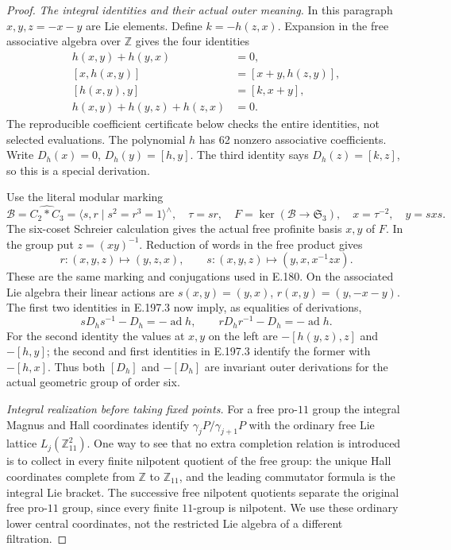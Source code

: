 \begin{proof}
\emph{The integral identities and their actual outer meaning.}
In this paragraph \(x,y,z=-x-y\) are Lie elements.  Define
\(k=-h(z,x)\).  Expansion in the free associative algebra over
\(\mathbb Z\) gives the four identities
\[
\begin{aligned}
h(x,y)+h(y,x)&=0,\\
[x,h(x,y)]&=[x+y,h(z,y)],\\
[h(x,y),y]&=[k,x+y],\\
h(x,y)+h(y,z)+h(z,x)&=0.
\end{aligned}
\tag{E.197.3}
\]
The reproducible coefficient certificate below checks the entire
identities, not selected evaluations.  The polynomial \(h\) has
62 nonzero associative coefficients.  Write
\(D_h(x)=0\), \(D_h(y)=[h,y]\).  The third identity says
\(D_h(z)=[k,z]\), so this is a special derivation.

Use the literal modular marking
\[
\mathcal B=\widehat{C_2*C_3}
 =\langle s,r\mid s^2=r^3=1\rangle^{\wedge},\quad
\tau=sr,\quad F=\ker(\mathcal B\to\mathfrak S_3),
\quad x=\tau^{-2},\quad y=sxs.
\tag{E.197.4}
\]
The six-coset Schreier calculation gives the actual free profinite
basis \(x,y\) of \(F\).  In the group put \(z=(xy)^{-1}\).
Reduction of words in the free product gives
\[
 r:(x,y,z)\longmapsto(y,z,x),\qquad
 s:(x,y,z)\longmapsto(y,x,x^{-1}zx).
\tag{E.197.5}
\]
These are the same marking and conjugations used in E.180.
On the associated Lie algebra their linear actions are
\(s(x,y)=(y,x)\), \(r(x,y)=(y,-x-y)\).
The first two identities in E.197.3 now imply, as equalities of
derivations,
\[
sD_hs^{-1}-D_h=-\operatorname{ad}h,
\qquad rD_hr^{-1}-D_h=-\operatorname{ad}h.
\tag{E.197.6}
\]
For the second identity the values at \(x,y\) on the left are
\(-[h(y,z),z]\) and \(-[h,y]\); the second and first identities
in E.197.3 identify the former with \(-[h,x]\).
Thus both \([D_h]\) and \(-[D_h]\) are invariant outer
derivations for the actual geometric group of order six.

\emph{Integral realization before taking fixed points.}
For a free pro-\(11\) group the integral Magnus and Hall
coordinates identify
\(\gamma_jP/\gamma_{j+1}P\) with the ordinary free Lie
lattice \(L_j(\mathbb Z_{11}^2)\).  One way to see that no
extra completion relation is introduced is to collect in every
finite nilpotent quotient of the free group: the unique Hall
coordinates complete from \(\mathbb Z\) to \(\mathbb Z_{11}\),
and the leading commutator formula is the integral Lie bracket.
The successive free nilpotent quotients separate the original
free pro-\(11\) group, since every finite \(11\)-group is
nilpotent.  We use these ordinary lower central coordinates,
not the restricted Lie algebra of a different filtration.


\end{proof}
